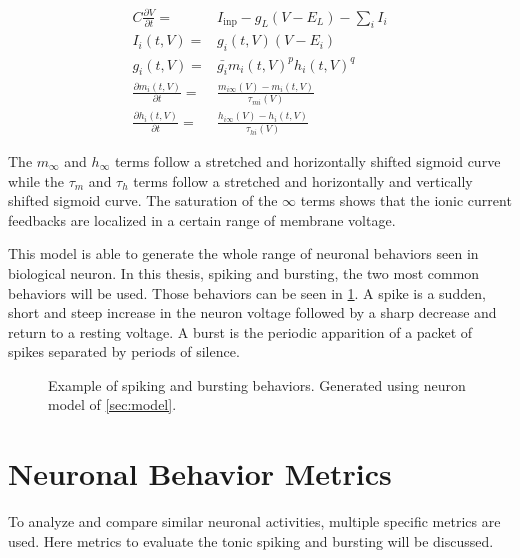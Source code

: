 \begin{align}
    C\frac{\partial V}{\partial t} =& I_\text{inp} - g_L\left(V-E_L\right) - \sum_i I_i\label{eq:hodgkinstart}\\
    I_i\left(t, V\right) =& g_i\left(t, V\right)\left(V - E_i\right)\\
    g_i\left(t, V\right) =& \bar{g_i}m_i\left(t, V\right)^p h_i\left(t, V\right)^q\\
    \frac{\partial m_i\left(t, V\right)}{\partial t} =& \frac{m_{i\infty}\left(V\right) - m_i\left(t, V\right)}{\tau_{mi}\left(V\right)}\\
    \frac{\partial h_i\left(t, V\right)}{\partial t} =& \frac{h_{i\infty}\left(V\right) - h_i\left(t, V\right)}{\tau_{hi}\left(V\right)}\label{eq:hodgkinend}
\end{align}

The $m_\infty$ and $h_\infty$ terms follow a stretched and horizontally shifted sigmoid curve while the $\tau_m$ and $\tau_h$ terms follow a stretched and horizontally and vertically shifted sigmoid curve. The saturation of the $\infty$ terms shows that the ionic current feedbacks are localized in a certain range of membrane voltage.


This model is able to generate the whole range of neuronal behaviors seen in biological neuron. In this thesis, spiking and bursting, the two most common behaviors will be used. Those behaviors can be seen in \cref{fig:behaviours}. A spike is a sudden, short and steep increase in the neuron voltage followed by a sharp decrease and return to a resting voltage. A burst is the periodic apparition of a packet of spikes separated by periods of silence.


\begin{figure}[htb]
    \centering
    \caption{Example of spiking and bursting behaviors. Generated using neuron model of \cref{sec:model}.}
    \label{fig:behaviours}
\end{figure}

\section{Neuronal Behavior Metrics}

To analyze and compare similar neuronal activities, multiple specific metrics are used. Here metrics to evaluate the tonic spiking and bursting will be discussed.

